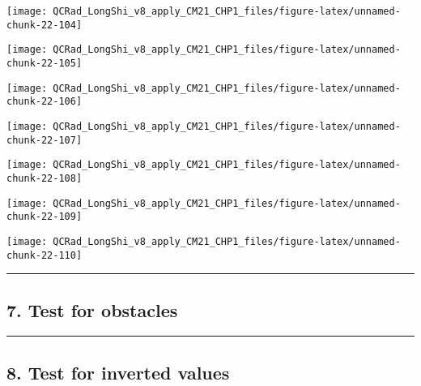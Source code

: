 \documentclass[
  10pt,
  a4paper,oneside]{article}
\begin{document}
\begin{center}\texttt{[image: QCRad\_LongShi\_v8\_apply\_CM21\_CHP1\_files/figure-latex/unnamed-chunk-22-104]} \end{center}

\begin{center}\texttt{[image: QCRad\_LongShi\_v8\_apply\_CM21\_CHP1\_files/figure-latex/unnamed-chunk-22-105]} \end{center}

\begin{center}\texttt{[image: QCRad\_LongShi\_v8\_apply\_CM21\_CHP1\_files/figure-latex/unnamed-chunk-22-106]} \end{center}

\begin{center}\texttt{[image: QCRad\_LongShi\_v8\_apply\_CM21\_CHP1\_files/figure-latex/unnamed-chunk-22-107]} \end{center}

\begin{center}\texttt{[image: QCRad\_LongShi\_v8\_apply\_CM21\_CHP1\_files/figure-latex/unnamed-chunk-22-108]} \end{center}

\begin{center}\texttt{[image: QCRad\_LongShi\_v8\_apply\_CM21\_CHP1\_files/figure-latex/unnamed-chunk-22-109]} \end{center}

\begin{center}\texttt{[image: QCRad\_LongShi\_v8\_apply\_CM21\_CHP1\_files/figure-latex/unnamed-chunk-22-110]} \end{center}

\begin{center}\rule{0.5\linewidth}{0.5pt}\end{center}

\newpage

\hypertarget{test-for-obstacles}{%
\subsection{7. Test for obstacles}\label{test-for-obstacles}}

\begin{center}\rule{0.5\linewidth}{0.5pt}\end{center}

\newpage

\hypertarget{test-for-inverted-values}{%
\subsection{8. Test for inverted values}\label{test-for-inverted-values}}
\end{document}

